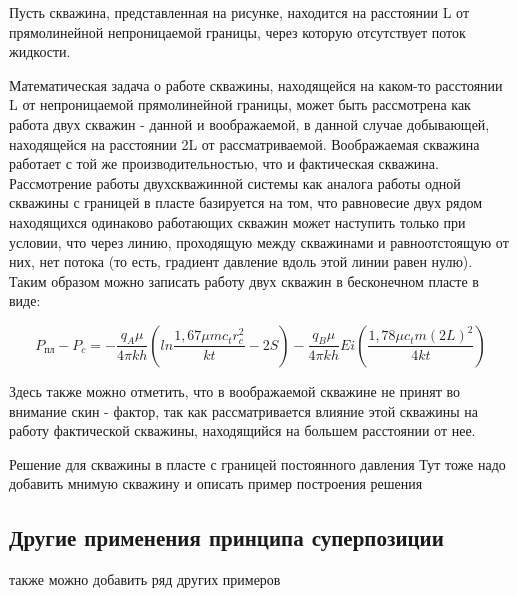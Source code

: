 Пусть скважина, представленная на рисунке, находится на расстоянии L от прямолинейной непроницаемой границы, через которую отсутствует поток жидкости.



Математическая задача о работе скважины, находящейся на каком-то расстоянии L от непроницаемой прямолинейной границы, может быть рассмотрена как  работа двух скважин - данной и воображаемой, в данной случае добывающей, находящейся на расстоянии 2L от рассматриваемой. Воображаемая скважина работает с той же производительностью, что и фактическая скважина. Рассмотрение работы двухскважинной системы как аналога работы одной скважины с границей в пласте базируется на том, что равновесие двух рядом находящихся одинаково работающих скважин может наступить только при условии, что через линию, проходящую между скважинами и равноотстоящую от них, нет потока (то есть, градиент давление вдоль этой линии равен нулю). Таким образом можно записать работу двух скважин в бесконечном пласте в виде:

$$ P_{пл} - P_c = - \frac{q_A \mu}{4\pi kh} \left( ln \frac{1,67 \mu m c_t r_c^2}{kt}-2S \right)- \frac{q_B \mu}{4\pi kh} Ei \left( \frac{1,78 \mu c_t m \left(2L\right)^2}{4kt} \right)$$

Здесь также можно отметить, что в воображаемой скважине не принят во внимание скин - фактор, так как рассматривается влияние этой скважины на работу фактической скважины, находящийся на большем расстоянии от нее. 



Решение для скважины в пласте с границей постоянного давления 
Тут тоже надо добавить мнимую скважину и описать пример построения решения


\subsection{Другие применения принципа суперпозиции}
также можно добавить ряд других примеров


